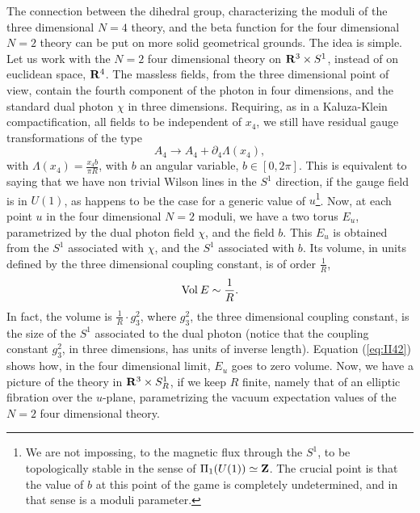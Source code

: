 The connection between the
dihedral group, characterizing the moduli of the three
dimensional $N\!=\!4$ theory, and the beta function for the
four dimensional $N\!=\!2$ theory can be put on more solid
geometrical grounds. The idea is simple. Let us work with the
$N\!=\!2$ four dimensional theory on ${\bf R}^3 \times S^1$,
instead of on euclidean space, ${\bf R}^4$. The massless fields,
from the three dimensional point of view, contain the fourth
component of the photon in four dimensions, and the standard dual
photon $\chi$ in three dimensions. Requiring, as in a
Kaluza-Klein compactification, all fields to be independent of
$x_4$, we still have residual gauge transformations of the type
\begin{equation}
A_4 \rightarrow A_4 + \partial_4 \Lambda(x_4),
\label{eq:II41}
\end{equation}
with $\Lambda(x_4)= \frac {x_4 b}{\pi R}$, with $b$ an angular
variable, $b \in [0,2\pi]$. This is equivalent to saying that we
have non trivial Wilson lines in the $S^1$ direction, if the
gauge field is in $U(1)$, as happens to be the case for a
generic value of $u$\footnote{We are not impossing, to the 
magnetic flux through the $S^1$, to be topologically stable in the sense of
$\Pi_1(U(1)) \simeq {\bf Z}$. The crucial point is that the value
of $b$ at this point of the game is completely undetermined, and
in that sense is a moduli parameter.}. Now, at each point $u$ in
the four dimensional $N\!=\!2$ moduli, we have a two torus $E_u$, 
parametrized by the dual photon field $\chi$, and the field $b$.
This $E_u$ is obtained from the $S^1$ associated with $\chi$, and
the $S^1$ associated with $b$. Its volume, in units defined by
the three dimensional coupling constant, is of order $\frac
{1}{R}$,
\begin{equation}
\hbox {Vol} \: E \sim \frac {1}{R}.
\label{eq:II42}
\end{equation}
In fact, the volume is $\frac {1}{R} \cdot g_3^2$, where $g_3^2$,
the three dimensional coupling constant, is the size of the $S^1$
associated to the dual photon (notice that the coupling
constant $g_3^2$, in three dimensions, has units of inverse
length). Equation (\ref{eq:II42}) shows how, in the four
dimensional limit, $E_u$ goes to zero volume. Now, we have a
picture of the theory in ${\bf R}^3 \times S_R^1$, if we keep $R$
finite, namely that of an elliptic fibration over the $u$-plane,
parametrizing the vacuum expectation values of the
$N\!=\!2$ four dimensional theory. 
  
